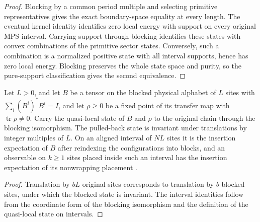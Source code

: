 \begin{proof}\leanok
    Blocking by a common period multiple and selecting primitive
    representatives gives the exact boundary-space equality at every
    length. The eventual kernel identity identifies zero local energy
    with support on every original MPS interval. Carrying support
    through blocking identifies these states with convex combinations
    of the primitive sector states. Conversely, such a combination is
    a normalized positive state with all interval supports, hence has
    zero local energy. Blocking preserves the whole state space and
    purity, so the pure-support classification gives the second
    equivalence.
\end{proof}

\begin{lemma}
    \label{thm:blocked_stationary_expectation}
    \leanok
    Let $L>0$, and let $B$ be a tensor on the blocked physical alphabet of
    $L$ sites with
    $\sum_i(B^i)^*B^i=I$, and let $\rho\geq0$ be a fixed point of its
    transfer map with $\operatorname{tr}\rho\neq0$. Carry the
    quasi-local state of $B$ and $\rho$ to the original chain through the
    blocking isomorphism. The pulled-back state is invariant under
    translations by integer multiples of $L$. On an aligned interval of
    $NL$ sites it is the insertion expectation of $B$ after reindexing the
    configurations into blocks, and an observable on $k\geq1$ sites placed
    inside such an interval has the insertion expectation of its
    nonwrapping placement \cite[lines~825--836 and
        Section~3]{Nachtergaele1996Spectral}.
\end{lemma}
\begin{proof}\leanok
    Translation by $bL$ original sites corresponds to translation by $b$
    blocked sites, under which the blocked state is invariant. The interval
    identities follow from the coordinate form of the blocking isomorphism
    and the definition of the quasi-local state on intervals.
\end{proof}

